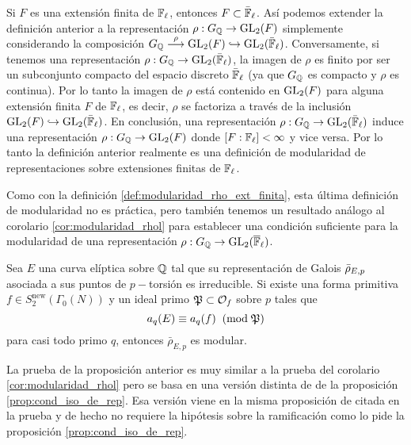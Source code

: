 \begin{nota}
  Si $F$ es una extensi\'on finita de $\mathbb{F}_{\ell}$, entonces $F\subset\bar{\mathbb{F}}_{\ell}$. As\'i podemos extender la definici\'on anterior a la representaci\'on $\rho:G_{\mathbb{Q}}\rightarrow\mathrm{GL}_2(F)$ simplemente considerando la composici\'on $G_{\mathbb{Q}}\overset{\rho}{\longrightarrow}\mathrm{GL}_2(F)\hookrightarrow\mathrm{GL}_2(\bar{\mathbb{F}}_{\ell})$. Conversamente, si tenemos una representaci\'on $\rho:G_{\mathbb{Q}}\rightarrow\mathrm{GL}_2(\bar{\mathbb{F}}_{\ell})$, la imagen de $\rho$ es finito por ser un subconjunto compacto del espacio discreto $\bar{\mathbb{F}}_{\ell}$ (ya que $G_{\mathbb{Q}}$ es compacto y $\rho$ es continua). Por lo tanto la imagen de $\rho$ est\'a contenido en $\mathrm{GL}_2(F)$ para alguna extensi\'on finita $F$ de $\mathbb{F}_{\ell}$, es decir, $\rho$ se factoriza a trav\'es de la inclusi\'on $\mathrm{GL}_2(F)\hookrightarrow\mathrm{GL}_2(\bar{\mathbb{F}}_{\ell})$.
  En conclusi\'on, una representaci\'on $\rho:G_{\mathbb{Q}}\rightarrow\mathrm{GL}_2(\bar{\mathbb{F}}_{\ell})$ induce una representaci\'on $\rho:G_{\mathbb{Q}}\rightarrow\mathrm{GL}_2(F)$ donde $[F:\mathbb{F}_{\ell}]<\infty$ y vice versa. Por lo tanto la definici\'on anterior realmente es una definici\'on de modularidad de representaciones sobre extensiones finitas de $\mathbb{F}_{\ell}$.
\end{nota}

Como con la definici\'on \ref{def:modularidad_rho_ext_finita}, esta \'ultima definici\'on de modularidad no es pr\'actica, pero tambi\'en tenemos un resultado an\'alogo al corolario \ref{cor:modularidad_rhol} para establecer una condici\'on suficiente para la modularidad de una representaci\'on $\rho:G_{\mathbb{Q}}\rightarrow\mathrm{GL}_2(\overline{\mathbb{F}}_\ell)$.

\begin{prop}\label{prop:cond_mod_rhop}
  Sea $E$ una curva el\'iptica sobre $\mathbb{Q}$ tal que su representaci\'on de Galois $\bar{\rho}_{E,p}$ asociada a sus puntos de $p-$torsi\'on es irreducible. Si existe una forma primitiva $f\in S_2^{\mathrm{new}}(\Gamma_0(N))$ y un ideal primo $\mathfrak{P}\subset\mathcal{O}_{f}$ sobre $p$ tales que
  \[
    a_q(E)\equiv a_q(f)\;\;(\mathrm{mod}\; \mathfrak{P})
  \]
para casi todo primo $q$, entonces $\bar{\rho}_{E,p}$ es modular.
\end{prop}

\begin{nota}
  La prueba de la proposici\'on anterior es muy similar a la prueba del corolario \ref{cor:modularidad_rhol} pero se basa en una versi\'on distinta de de la proposici\'on \ref{prop:cond_iso_de_rep}. Esa versi\'on viene en la misma proposici\'on de \cite{SaitoFLTBT} citada en la prueba y de hecho no requiere la hip\'otesis sobre la ramificaci\'on como lo pide la proposici\'on \ref{prop:cond_iso_de_rep}.
\end{nota}


